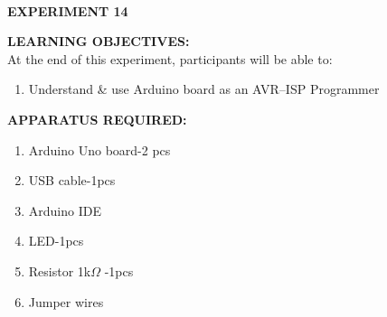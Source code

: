 \documentclass[12pt,a4paper]{article}
\begin{document}
\begin{center}

\textbf{\large \\EXPERIMENT 14 }\\[6pt]
\end{center}

\textbf{\large LEARNING OBJECTIVES:}\\[3pt]
At the end of this experiment, participants will be able to:\vspace{-6mm}\begin{enumerate}
 \setlength\itemsep{-0.3em}
\item Understand \& use Arduino board as an AVR–ISP Programmer   \\
\end{enumerate}

\textbf{\large APPARATUS REQUIRED:}\\
\vspace{-3mm}
\begin{enumerate}
 \setlength\itemsep{-0.3em}
\item Arduino Uno board-2 pcs \\
\item USB cable-1pcs\\
\item Arduino IDE
\item LED-1pcs\\
\item Resistor 1k$\Omega$ -1pcs\\
\item Jumper wires\\

\end{enumerate}
\end{document}
